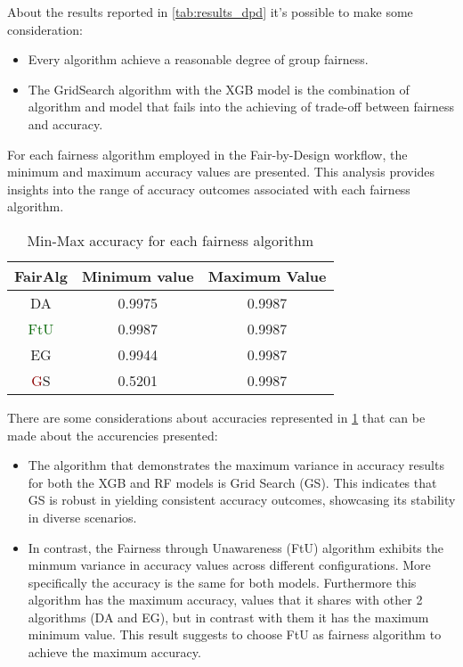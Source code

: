About the results reported in \cref{tab:results_dpd} it's possible to make some consideration:

\begin{itemize}
        \item Every algorithm achieve a reasonable degree of group fairness.

        \item The GridSearch algorithm with the XGB model is the combination of algorithm and model that fails into the achieving of trade-off between fairness and accuracy.

\end{itemize}

For each fairness algorithm employed in the Fair-by-Design workflow, the minimum and maximum accuracy values are presented. This analysis provides insights into the range of accuracy outcomes associated with each fairness algorithm.

\begin{table}
    \centering
    \begin{tabular}{|c|c|c|}
        \hline
        \textbf{FairAlg} & \textbf{Minimum value} & \textbf{Maximum Value} \\
        \hline
        DA & 0.9975 & 0.9987 \\
        \hline
        \textcolor{darkgreen}{FtU} & 0.9987 & 0.9987 \\
        \hline
        EG & 0.9944 & 0.9987 \\
        \hline
        \textcolor{darkred}GS & 0.5201 & 0.9987 \\
        \hline
    \end{tabular}
    \caption{Min-Max accuracy for each fairness algorithm}
    \label{tab:accuracies}
\end{table}

There are some considerations about accuracies represented in \cref{tab:accuracies} that can be made about the accurencies presented:
\begin{itemize}

    \item The algorithm that demonstrates the maximum variance in accuracy results for both the XGB and RF models is Grid Search (GS). This indicates that GS is robust in yielding consistent accuracy outcomes, showcasing its stability in diverse scenarios.

    \item In contrast, the Fairness through Unawareness (FtU) algorithm exhibits the minmum variance in accuracy values across different configurations. More specifically the accuracy is the same for both models. Furthermore this algorithm has the maximum accuracy, values that it shares with other 2 algorithms (DA and EG), but in contrast with them it has the maximum minimum value. This result suggests to choose FtU as fairness algorithm to achieve the maximum accuracy.
\end{itemize}

